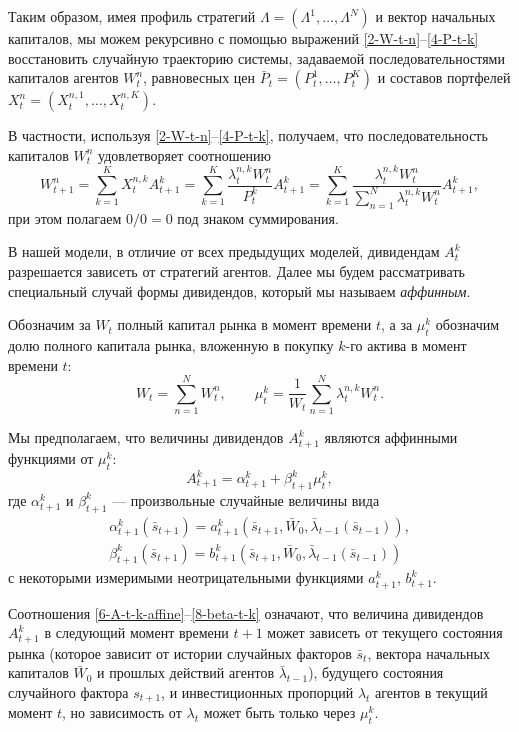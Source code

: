 \documentclass[a4paper,12pt,russian]{article} %
\theoremstyle{definition}
\begin{document}
Таким образом, имея профиль стратегий $\Lambda=(\Lambda^1,\dots,\Lambda^N)$ и вектор начальных капиталов, мы можем рекурсивно с помощью выражений \eqref{2-W-t-n}--\eqref{4-P-t-k} восстановить случайную траекторию системы, задаваемой последовательностями капиталов агентов $W_t^n$, равновесных цен $ \bar P_t=(P_{t}^1,\dots,P_{t}^K)$ и составов портфелей $X_t^n=(X_{t}^{n,1},\dots,X_{t}^{n,K})$.

В частности, используя \eqref{2-W-t-n}--\eqref{4-P-t-k}, получаем, что последовательность капиталов $W_t^n$ удовлетворяет соотношению
\begin{equation}
\label{5-dynamics-of-W}
W_{t+1}^n = \sum_{k=1}^K 
X_{t}^{n,k} A_{t+1}^k =
\sum_{k=1}^K \frac{\lambda_{t}^{n,k} W_t^n}{P_t^k} A_{t+1}^k=
\sum_{k=1}^K \frac{\lambda_{t}^{n,k} W_t^n}{\sum_{n=1}^N \lambda_{t}^{n,k} W_t^n} A_{t+1}^k,
\end{equation}
при этом полагаем $0/0=0$ под знаком суммирования. 

В нашей модели, в отличие от всех предыдущих моделей, дивидендам $A_{t}^k$ разрешается зависеть от стратегий агентов. Далее мы будем рассматривать специальный случай формы дивидендов, который мы называем \textit{аффинным}.

Обозначим за $W_t$ полный капитал рынка в момент времени $t$, а за $\mu_{t}^k$ обозначим долю полного капитала рынка, вложенную в покупку $k$-го актива в момент времени $t$:
\[
W_t = \sum_{n=1}^N W_t^n, \qquad
\mu_{t}^k = \frac{1}{W_t}\sum_{n=1}^{N}\lambda_{t}^{n,k} W_t^n.
\]

Мы предполагаем, что величины дивидендов $A_{t+1}^k$ являются аффинными функциями от $\mu_{t}^k$:
\begin{equation}
\label{6-A-t-k-affine}
A_{t+1}^k = \alpha_{t+1}^k + \beta_{t+1}^k \mu_{t}^k,
\end{equation}
где $\alpha_{t+1}^k$ и $\beta_{t+1}^k$ — произвольные случайные величины вида
\begin{gather}
\label{7-alpha-t-k}
\alpha_{t+1}^k( \bar s_{t+1}) = a_{t+1}^k( \bar s_{t+1}, \bar W_0, \bar \lambda_{t-1}( \bar s_{t-1} )), \\
\label{8-beta-t-k}
\beta_{t+1}^k( \bar s_{t+1} ) = b_{t+1}^k ( \bar s_{t+1},\bar W_0, \bar\lambda_{t-1}( \bar s_{t-1} ))
\end{gather}
с некоторыми измеримыми неотрицательными функциями $a_{t+1}^k$, $b_{t+1}^k$.

Соотношения \eqref{6-A-t-k-affine}--\eqref{8-beta-t-k} означают, что величина дивидендов $A_{t+1}^k$ в следующий момент времени $t+1$ может зависеть от текущего состояния рынка (которое зависит от истории случайных факторов $\bar s_{t}$, вектора начальных капиталов $\bar W_0$ и прошлых действий агентов $\bar \lambda_{t-1}$), будущего состояния случайного фактора $s_{t+1}$, и инвестиционных пропорций $ \lambda_t$ агентов в текущий момент $t$, но зависимость от $\lambda_t$ может быть только через $\mu_{t}^k$. 
\end{document}

